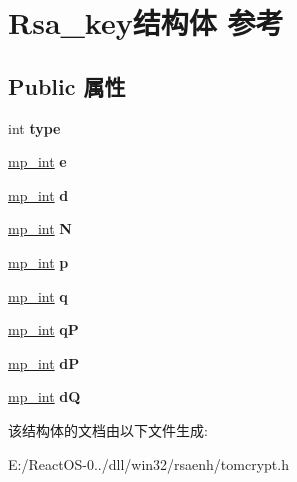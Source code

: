 \hypertarget{struct_rsa__key}{}\section{Rsa\+\_\+key结构体 参考}
\label{struct_rsa__key}
\subsection*{Public 属性}
\begin{DoxyCompactItemize}
\item 
\mbox{\label{struct_rsa__key_acce7674d4183a9fe3dbd396a7c1d852b}} 
int {\bfseries type}
\item 
\mbox{\label{struct_rsa__key_a5a5c6ef37d699b445ea099861245f1b8}} 
\hyperlink{structmp__int}{mp\+\_\+int} {\bfseries e}
\item 
\mbox{\label{struct_rsa__key_a7d072d23711d4732428fcf83a73be982}} 
\hyperlink{structmp__int}{mp\+\_\+int} {\bfseries d}
\item 
\mbox{\label{struct_rsa__key_a17337e4d38171ce497776c36ea48ac07}} 
\hyperlink{structmp__int}{mp\+\_\+int} {\bfseries N}
\item 
\mbox{\label{struct_rsa__key_a015da3eeb5e7ef0aeef3530aeed7e00d}} 
\hyperlink{structmp__int}{mp\+\_\+int} {\bfseries p}
\item 
\mbox{\label{struct_rsa__key_a1f656049957dd0484baadba4ed144438}} 
\hyperlink{structmp__int}{mp\+\_\+int} {\bfseries q}
\item 
\mbox{\label{struct_rsa__key_a657df14d9a6a68d3f40c6f06ec3a4a8b}} 
\hyperlink{structmp__int}{mp\+\_\+int} {\bfseries qP}
\item 
\mbox{\label{struct_rsa__key_a44e0b4657a4ce1fca66802b996f69b4d}} 
\hyperlink{structmp__int}{mp\+\_\+int} {\bfseries dP}
\item 
\mbox{\label{struct_rsa__key_a52a0e31703ddaaea9844ec368a01b560}} 
\hyperlink{structmp__int}{mp\+\_\+int} {\bfseries dQ}
\end{DoxyCompactItemize}


该结构体的文档由以下文件生成\+:\begin{DoxyCompactItemize}
\item 
E\+:/\+React\+O\+S-\/0../dll/win32/rsaenh/tomcrypt.\+h\end{DoxyCompactItemize}
